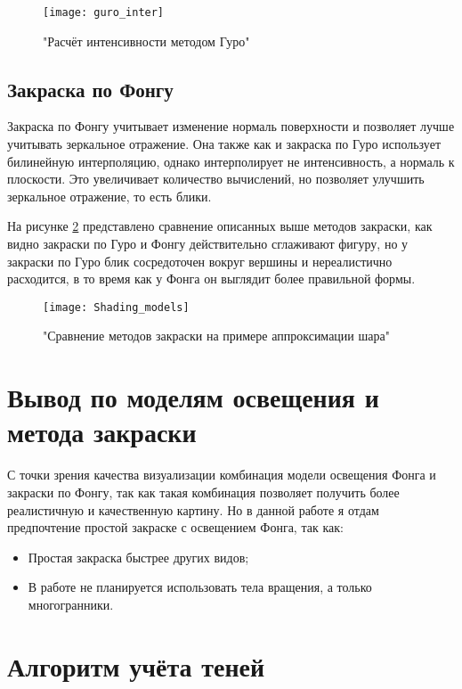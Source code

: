 \begin{figure}[h]
	\centering
	\texttt{[image: guro\_inter]}
	\caption{"Расчёт интенсивности методом Гуро"}
	\label{fig:guro_inter}
\end{figure}

\subsection{Закраска по Фонгу}
Закраска по Фонгу учитывает изменение нормаль поверхности и позволяет лучше учитывать зеркальное отражение. Она также как и закраска по Гуро использует билинейную интерполяцию, однако интерполирует не интенсивность, а нормаль к плоскости. Это увеличивает количество вычислений, но позволяет улучшить зеркальное отражение, то есть блики.

На рисунке \ref{fig:shading} представлено сравнение описанных выше методов закраски, как видно закраски по Гуро и Фонгу действительно сглаживают фигуру, но у закраски по Гуро блик сосредоточен вокруг вершины и нереалистично расходится, в то время как у Фонга он выглядит более правильной формы.

\begin{figure}[h]
	\centering
	\texttt{[image: Shading\_models]}
	\caption{"Сравнение методов закраски на примере аппроксимации шара"}
	\label{fig:shading}
\end{figure}

\section{Вывод по моделям освещения и метода закраски}

С точки зрения качества визуализации комбинация модели освещения Фонга и закраски по Фонгу, так как такая комбинация позволяет получить более реалистичную и качественную картину. Но в данной работе я отдам предпочтение простой закраске с освещением Фонга, так как:
\begin{itemize}
	\item Простая закраска быстрее других видов;
	\item В работе не планируется использовать тела вращения, а только многогранники.
\end{itemize}




\section{Алгоритм учёта теней}

